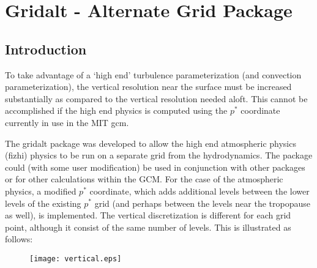 \section{Gridalt - Alternate Grid Package}

\subsection {Introduction} 
To take advantage of a `high end' turbulence parameterization
(and convection parameterization), the vertical resolution near the surface
must be increased substantially as compared to the vertical resolution needed
aloft. This cannot be accomplished if the high end physics is computed using 
the $p^*$ coordinate currently in use in the MIT gcm. 

The gridalt package was developed to allow the high end atmospheric physics 
(fizhi) physics to be run on a separate grid from the hydrodynamics. The package
could (with some user modification) be used in conjunction with other packages 
or for other calculations within the GCM. For the case of the atmospheric 
physics, a modified $p^*$ coordinate, which adds additional levels between
the lower levels of the existing $p^*$ grid (and perhaps between the levels near 
the tropopause as well), is implemented. The vertical discretization is
different for each grid point, although it consist of the same number of 
levels. This is illustrated as follows:
\begin{figure}[htbp]
\vspace*{-0.4in}
\begin{center}
\texttt{[image: vertical.eps]}
\end{center}
\end{figure}

